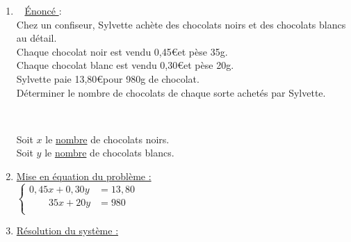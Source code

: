 \begin{enumerate}
\reversemarginpar 


\item \marginpar[\underline{Ex \no 1}]~ \underline{ Énoncé }:\\

Chez un confiseur, Sylvette achète des chocolats noirs et des chocolats blancs au détail.\\

Chaque chocolat noir est vendu 0,45\euro et pèse 35g.\\
Chaque chocolat blanc est vendu 0,30\euro et pèse 20g. \\

Sylvette paie 13,80\euro pour 980g de chocolat. \\

Déterminer le nombre de chocolats de chaque sorte achetés par Sylvette.\\


\bigskip 

~\parbox{9cm}{Soit $x$ le \underline{nombre} de chocolats noirs.\\
Soit $y$ le \underline{nombre} de chocolats blancs.}

\bigskip 

\item \underline{Mise en équation du problème :  }\\

$\begin{cases}
0,45x + 0,30y \!\!\!\!\!\!\!\! &= 13,80\\
\qquad 35x + 20y     \!\!\!\!\!\!\!\! &= 980\\
\end{cases}$ \\

\bigskip 

\item \underline{Résolution du système : }\\


\end{enumerate}
